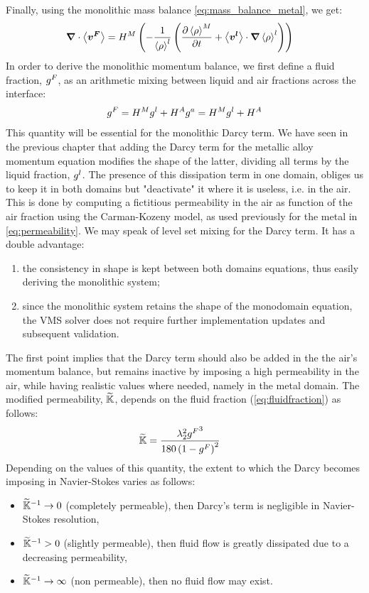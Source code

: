 Finally, using the monolithic mass balance \cref{eq:mass_balance_metal}, we get:
\begin{align}
\label{eq:monolithic_mass}
& \boldsymbol{\nabla} \cdot \left \langle \boldsymbol{v^F} \right \rangle = H^M \left( -\frac{1}{\left \langle \rho \right \rangle^l} \left( \frac{\partial \left \langle \rho \right \rangle^M }{\partial t} + \left \langle \boldsymbol{v^l} \right \rangle \cdot  \boldsymbol{\nabla} \left \langle \rho \right \rangle^l \right) \right)
\end{align}
In order to derive the monolithic momentum balance, we first define a fluid fraction, ${g^F}$, as an arithmetic mixing 
between liquid and air fractions across the interface:
\begin{align}
\label{eq:fluidfraction}
{g^F} = H^M {g^l} + H^A {g^a} = H^M {g^l} + H^A
\end{align}
This quantity will be essential for the monolithic Darcy term.
We have seen in the previous chapter that adding the Darcy term for the metallic alloy momentum equation modifies the shape of the 
latter, dividing all terms by the liquid fraction, ${g^l}$. The presence of this dissipation term 
in one domain, obliges us to keep it in both domains but "deactivate" it where it is useless, i.e. in the air.
This is done by computing a fictitious permeability in the air as function of the air fraction using the Carman-Kozeny model,
as used previously for the metal in \cref{eq:permeability}. We may speak of level set mixing for the Darcy term.
It has a double advantage:
\begin{enumerate}
\item the consistency in shape is kept between both domains equations, thus easily deriving the monolithic system;
\item since the monolithic system retains the shape of the monodomain equation, the VMS solver does not require further implementation updates
and subsequent validation.
\end{enumerate}
%
The first point implies that the Darcy term should also be added in the the air's momentum balance, but remains inactive 
by imposing a high permeability in the air, while having realistic values where needed, namely in the metal domain.
The modified permeability, $\widetilde{\mathbb{K}}$, depends on the fluid fraction (\cref{eq:fluidfraction}) as follows:
\begin{align}
\label{eq:darcy_modif}
&\widetilde{\mathbb{K}} = \frac{{\lambda}_{2}^2 {g^F}^3}{180\left( 1-{g^F} \right)^2}	
\end{align}
Depending on the values of this quantity, the extent to which the Darcy becomes imposing in Navier-Stokes varies as follows:
\begin{itemize}
\itemsep0em
\item $\widetilde{\mathbb{K}}^{-1} \rightarrow 0$ (completely permeable), then Darcy's term is negligible in Navier-Stokes resolution,
\item $\widetilde{\mathbb{K}}^{-1} > 0$ (slightly permeable), then fluid flow is greatly dissipated due to a decreasing permeability,
\item $\widetilde{\mathbb{K}}^{-1} \rightarrow \infty$ (non permeable), then no fluid flow may exist.
\end{itemize}

